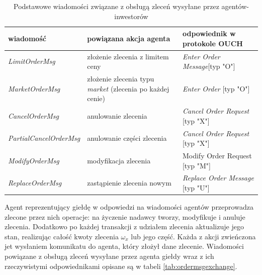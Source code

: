 \begin{table}
\caption{Podstawowe wiadomości związane z obsługą zleceń wysyłane przez agentów-inwestorów} 
\label{tab:ordermsgtrader}

\begin{center}
\begin{tabular}{ |p{4.5cm}|p{4.5cm}|p{4.5cm}|}
\hline
\textbf{wiadomość} & \textbf{powiązana akcja agenta} &\textbf{odpowiednik w protokole OUCH} \\
\hline
\textit{LimitOrderMsg} & złożenie zlecenia z limitem ceny & \textit{Enter Order Message}[typ "O"] \\
\hline
\textit{MarketOrderMsg} & złożenie zlecenia typu \textit{market} (zlecenia po każdej cenie)& \textit{Enter Order} [typ "O"]\\
\hline
\textit{CancelOrderMsg} & anulowanie zlecenia & \textit{Cancel Order Request} [typ "X"]\\
\hline
\textit{PartialCancelOrderMsg} & anulowanie części zlecenia &\textit{Cancel Order Request} [typ "X"] \\
\hline
\textit{ModifyOrderMsg} & modyfikacja zlecenia & {Modify Order Request} [typ "M"]\\
\hline
\textit{ReplaceOrderMsg} & zastąpienie zlecenia nowym & \textit{Replace Order Message} [typ "U"]\\
\hline
\end{tabular} 
\end{center}
\end{table}
Agent reprezentujący giełdę w odpowiedzi na wiadomości agentów przeprowadza zlecone przez nich operacje: na życzenie nadawcy tworzy, modyfikuje i anuluje zlecenia. Dodatkowo po każdej transakcji z udziałem zlecenia aktualizuje jego stan, realizując całość kwoty zlecenia $\omega_x$ lub jego część. Każda z akcji zwieńczona jet wysłaniem komunikatu do agenta, który złożył dane zlecenie. Wiadomości powiązane z obsługą zleceń wysyłane przez agenta giełdy wraz z ich rzeczywistymi odpowiednikami opisane są w tabeli \ref{tab:ordermsgexchange}.
